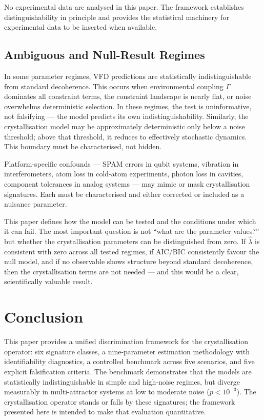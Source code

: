 \documentclass[12pt]{article}
\begin{document}
No experimental data are analysed in this paper. The framework establishes distinguishability in principle and provides the statistical machinery for experimental data to be inserted when available.

\subsection{Ambiguous and Null-Result Regimes}

In some parameter regimes, VFD predictions are statistically indistinguishable from standard decoherence. This occurs when environmental coupling $\Gamma$ dominates all constraint terms, the constraint landscape is nearly flat, or noise overwhelms deterministic selection. In these regimes, the test is uninformative, not falsifying --- the model predicts its own indistinguishability. Similarly, the crystallisation model may be approximately deterministic only below a noise threshold; above that threshold, it reduces to effectively stochastic dynamics. This boundary must be characterised, not hidden.

Platform-specific confounds --- SPAM errors in qubit systems, vibration in interferometers, atom loss in cold-atom experiments, photon loss in cavities, component tolerances in analog systems --- may mimic or mask crystallisation signatures. Each must be characterised and either corrected or included as a nuisance parameter.

This paper defines how the model can be tested and the conditions under which it can fail. The most important question is not ``what are the parameter values?'' but whether the crystallisation parameters can be distinguished from zero. If $\hat{\lambda}$ is consistent with zero across all tested regimes, if AIC/BIC consistently favour the null model, and if no observable shows structure beyond standard decoherence, then the crystallisation terms are not needed --- and this would be a clear, scientifically valuable result.

\section{Conclusion}
\label{sec:conclusion}

This paper provides a unified discrimination framework for the crystallisation operator: six signature classes, a nine-parameter estimation methodology with identifiability diagnostics, a controlled benchmark across five scenarios, and five explicit falsification criteria. The benchmark demonstrates that the models are statistically indistinguishable in simple and high-noise regimes, but diverge measurably in multi-attractor systems at low to moderate noise ($p < 10^{-3}$). The crystallisation operator stands or falls by these signatures; the framework presented here is intended to make that evaluation quantitative.



\end{document}
